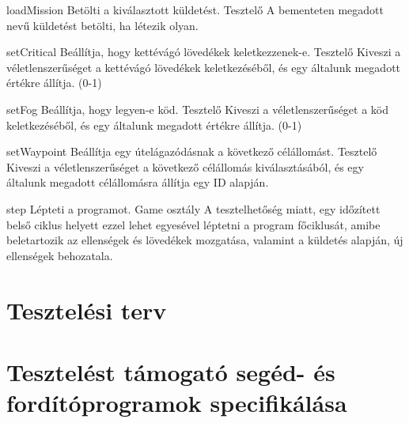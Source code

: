 \usecase
{loadMission}
{Betölti a kiválasztott küldetést.}
{Tesztelő}
{A bementeten megadott nevű küldetést betölti, ha létezik olyan.}

\usecase
{setCritical}
{Beállítja, hogy kettévágó lövedékek keletkezzenek-e.}
{Tesztelő}
{Kiveszi a véletlenszerűséget a kettévágó lövedékek keletkezéséből, és egy általunk megadott értékre állítja. (0-1)}

\usecase
{setFog}
{Beállítja, hogy legyen-e köd.}
{Tesztelő}
{Kiveszi a véletlenszerűséget a köd keletkezéséből, és egy általunk megadott értékre állítja. (0-1)}

\usecase
{setWaypoint}
{Beállítja egy útelágazódásnak a következő célállomást.}
{Tesztelő}
{Kiveszi a véletlenszerűséget a következő célállomás kiválasztásából, és egy általunk megadott célállomásra állítja egy ID alapján.}

\usecase
{step}
{Lépteti a programot.}
{Game osztály}
{A tesztelhetőség miatt, egy időzített belső ciklus helyett ezzel lehet egyesével léptetni a program főciklusát,
 amibe beletartozik az ellenségek és lövedékek mozgatása, valamint a küldetés alapján, új ellenségek behozatala.}

\section{Tesztelési terv}


\section{Tesztelést támogató segéd- és fordítóprogramok specifikálása}

